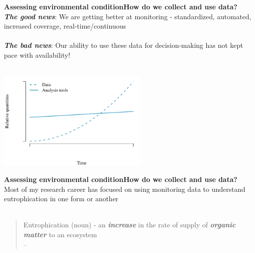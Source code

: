 \documentclass[serif]{beamer}\usepackage[]{graphicx}\usepackage[]{color}
\newcommand{\emtxt}[1]{\textbf{\textit{#1}}}
\begin{document}
\begin{frame}{\textbf{Assessing environmental condition}}{\textbf{How do we collect and use data?}}
\emtxt{The good news}: We are getting better at monitoring - standardized, automated, increased coverage, real-time/continuous \\~\\
\emtxt{The bad news}: Our ability to use these data for decision-making has not kept pace with availability! \\~\\


{\centering \includegraphics[width=0.55\textwidth]{fig/theo-1} 

}



\end{frame}

\begin{frame}{\textbf{Assessing environmental condition}}{\textbf{How do we collect and use data?}}
Most of my research career has focused on using monitoring data to understand eutrophication in one form or another \\~\\
\onslide<+->
\begin{quote}
Eutrophication (noun) - an \emtxt{increase} in the rate of supply of \emtxt{organic matter} to an ecosystem\\
\hfill -- \cite{Nixon95}
\end{quote}
\begin{center}
\end{center}
\vspace{-0.5cm}\hspace*{15pt}\\~\\
\end{frame}
\end{document}
